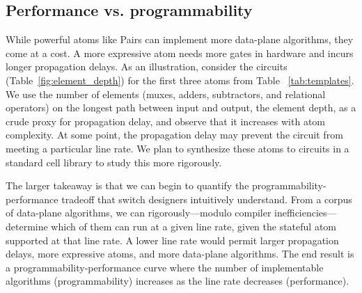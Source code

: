 \subsection{Performance vs. programmability}
\label{ss:perfprog}

While powerful atoms like Pairs can implement more data-plane algorithms, they
come at a cost.  A more expressive atom needs more gates in hardware and incurs
longer propagation delays.  As an illustration, consider the circuits
(Table~\ref{fig:element_depth}) for the first three atoms from Table
~\ref{tab:templates}. We use the number of elements (muxes, adders,
subtractors, and relational operators) on the longest path between input and
output, the element depth, as a crude proxy for propagation delay, and observe
that it increases with atom complexity. At some point, the propagation delay
may prevent the circuit from meeting a particular line rate.  We plan to
synthesize these atoms to circuits in a standard cell library to study this
more rigorously.

The larger takeaway is that we can begin to quantify the
programmability-performance tradeoff that switch designers intuitively
understand. From a corpus of data-plane algorithms, we can rigorously---modulo
compiler inefficiencies---determine which of them can run at a given line rate,
given the stateful atom supported at that line rate. A lower line rate would
permit larger propagation delays, more expressive atoms, and more data-plane
algorithms. The end result is a programmability-performance curve where the
number of implementable algorithms (programmability) increases as the line rate
decreases (performance).
